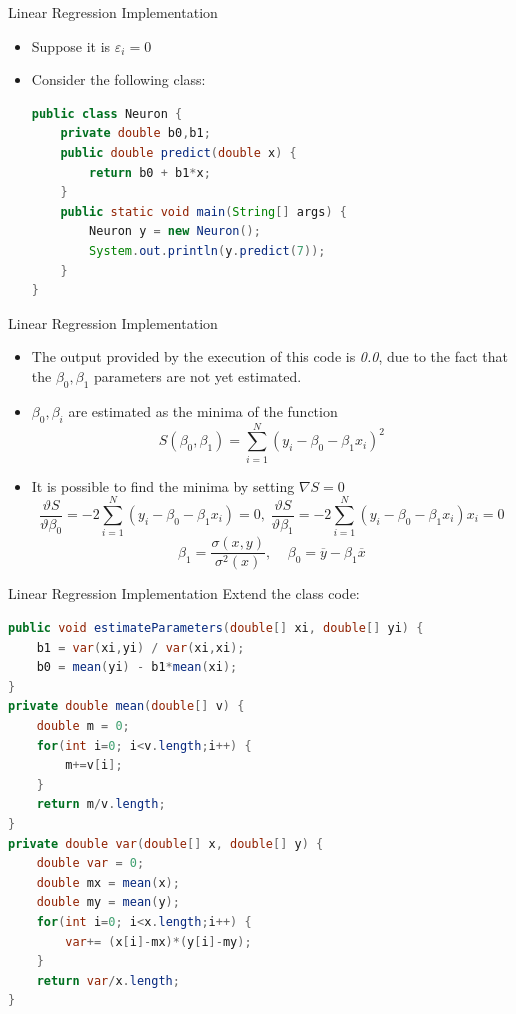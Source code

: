 \documentclass[xcolor ={table,usenames,dvipsnames}]{beamer}
\theoremstyle{definition}
\begin{document}
\begin{frame}[fragile]{Linear Regression Implementation}
\begin{itemize}
	\item Suppose it is $\varepsilon_i = 0$
	\item Consider the following class:
\begin{lstlisting}[language=Java]
public class Neuron {
	private double b0,b1;
	public double predict(double x) {
		return b0 + b1*x;
	}
	public static void main(String[] args) {
		Neuron y = new Neuron();
		System.out.println(y.predict(7));
	}
}
\end{lstlisting}
\end{itemize}
\end{frame}
\begin{frame}{Linear Regression Implementation}
\begin{itemize}
	\item The output provided by the execution of this code is \textit{0.0}, due to the fact that the $\beta_0,\beta_1$ parameters are not yet estimated.
	\item  $\beta_0,\beta_i$ are estimated as the minima of the function
	$$
	S(\beta_0,\beta_1) = \sum_{i=1}^N (y_i - \beta_0 - \beta_1 x_i)^2
	$$
	\item It is possible to find the minima by setting
	$\nabla S = 0$
	$$
	\frac{\vartheta S}{\vartheta \beta_0} = -2 \sum_{i=1}^N (y_i - \beta_0 - \beta_1x_i) = 0,\;
	\frac{\vartheta S}{\vartheta \beta_1} = -2 \sum_{i=1}^N (y_i - \beta_0 - \beta_1 x_i) x_i = 0
	$$
	$$
	\beta_1 = \frac{\sigma(x,y)}{\sigma^2(x)},\;\;\;\;
	\beta_0 = \overline y - \beta_1 \overline x
	$$
\end{itemize}
\end{frame}
\begin{frame}[fragile]{Linear Regression Implementation}
	Extend the class code:
	\begin{lstlisting}[language = Java]
public void estimateParameters(double[] xi, double[] yi) {
	b1 = var(xi,yi) / var(xi,xi);
	b0 = mean(yi) - b1*mean(xi);
}
private double mean(double[] v) {
	double m = 0;
	for(int i=0; i<v.length;i++) {
		m+=v[i];
	}
	return m/v.length;
}
private double var(double[] x, double[] y) {
	double var = 0;
	double mx = mean(x);
	double my = mean(y);
	for(int i=0; i<x.length;i++) {
		var+= (x[i]-mx)*(y[i]-my);
	}
	return var/x.length;
}
\end{lstlisting}
\end{frame}
\end{document}
